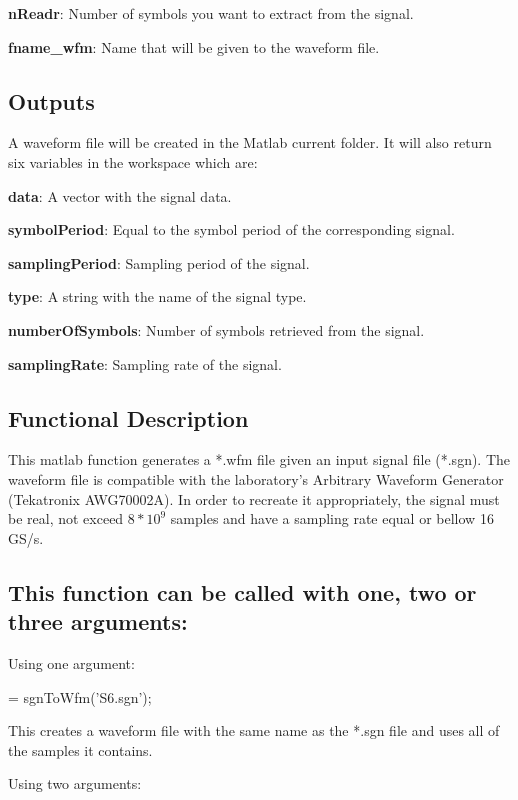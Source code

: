 \textbf{nReadr}: Number of symbols you want to extract from the signal.
\bigskip

\textbf{fname\_wfm}: Name that will be given to the waveform file.


\subsection*{Outputs}
A waveform file will be created in the Matlab current folder. It will also return six variables in the workspace which are:
\bigskip

\textbf{data}: A vector with the signal data.
\bigskip

\textbf{symbolPeriod}: Equal to the symbol period of the corresponding signal.
\bigskip

\textbf{samplingPeriod}: Sampling period of the signal.
\bigskip

\textbf{type}: A string with the name of the signal type.
\bigskip

\textbf{numberOfSymbols}: Number of symbols retrieved from the signal.
\bigskip

\textbf{samplingRate}: Sampling rate of the signal.



\subsection*{Functional Description}

This matlab function generates a *.wfm file given an input signal file (*.sgn). The waveform file is compatible with the laboratory's Arbitrary Waveform Generator (Tekatronix AWG70002A). In order to recreate it appropriately, the signal must be real, not exceed $8*10^9$ samples and have a sampling rate equal or bellow 16 GS/s.


\subsection*{This function can be called with one, two or three arguments:}
Using one argument:

\bigskip

 = sgnToWfm('S6.sgn');
\bigskip

\noindent
This creates a waveform file with the same name as the *.sgn file and uses all of the samples it contains.
\bigskip

\noindent
Using two arguments:

